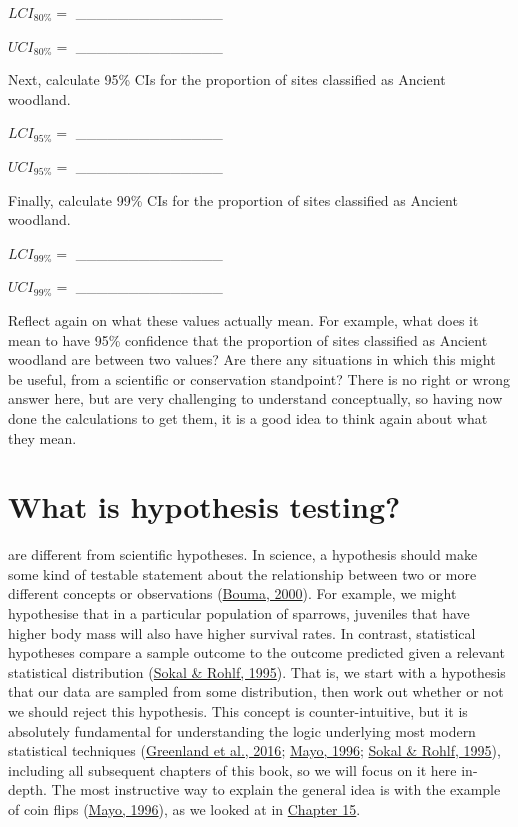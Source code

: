 \documentclass[
  openany]{krantz}
\begin{document}
\(LCI_{80\%} =\) \_\_\_\_\_\_\_\_\_\_\_\_\_\_

\(UCI_{80\%} =\) \_\_\_\_\_\_\_\_\_\_\_\_\_\_

Next, calculate 95\% CIs for the proportion of sites classified as Ancient woodland.

\(LCI_{95\%} =\) \_\_\_\_\_\_\_\_\_\_\_\_\_\_

\(UCI_{95\%} =\) \_\_\_\_\_\_\_\_\_\_\_\_\_\_

Finally, calculate 99\% CIs for the proportion of sites classified as Ancient woodland.

\(LCI_{99\%} =\) \_\_\_\_\_\_\_\_\_\_\_\_\_\_

\(UCI_{99\%} =\) \_\_\_\_\_\_\_\_\_\_\_\_\_\_

Reflect again on what these values actually mean.
For example, what does it mean to have 95\% confidence that the proportion of sites classified as Ancient woodland are between two values?
Are there any situations in which this might be useful, from a scientific or conservation standpoint?
There is no right or wrong answer here, but  are very challenging to understand conceptually, so having now done the calculations to get them, it is a good idea to think again about what they mean.

\hypertarget{Chapter_21}{%
\chapter{What is hypothesis testing?}\label{Chapter_21}}

 are different from scientific hypotheses.
In science, a hypothesis should make some kind of testable statement about the relationship between two or more different concepts or observations (\protect\hyperlink{ref-Bouma2000}{Bouma, 2000}).
For example, we might hypothesise that in a particular population of sparrows, juveniles that have higher body mass will also have higher survival rates.
In contrast, statistical hypotheses compare a sample outcome to the outcome predicted given a relevant statistical distribution (\protect\hyperlink{ref-Sokal1995}{Sokal \& Rohlf, 1995}).
That is, we start with a hypothesis that our data are sampled from some distribution, then work out whether or not we should reject this hypothesis.
This concept is counter-intuitive, but it is absolutely fundamental for understanding the logic underlying most modern statistical techniques (\protect\hyperlink{ref-Greenland2016}{Greenland et al., 2016}; \protect\hyperlink{ref-Mayo1996}{Mayo, 1996}; \protect\hyperlink{ref-Sokal1995}{Sokal \& Rohlf, 1995}), including all subsequent chapters of this book, so we will focus on it here in-depth.
The most instructive way to explain the general idea is with the example of coin flips (\protect\hyperlink{ref-Mayo1996}{Mayo, 1996}), as we looked at in \protect\hyperlink{Chapter_15}{Chapter 15}.
\end{document}
